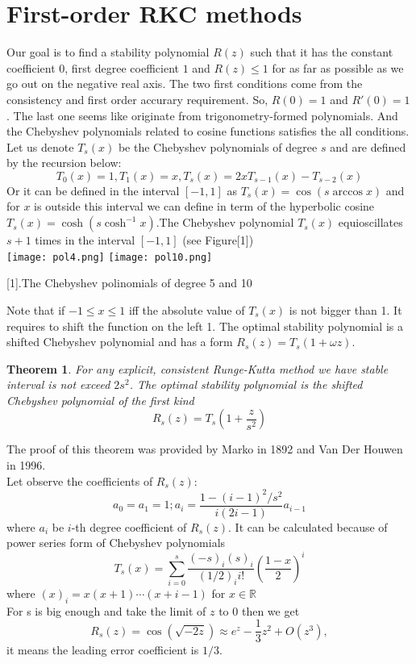 \documentclass{article}
\theoremstyle{theorem}
\newtheorem{theorem}{Theorem}
\theoremstyle{definition}
\begin{document}
	\section{First-order RKC methods}
Our goal is to find a stability polynomial $R(z)$ such that it has the constant coefficient $0$, first degree coefficient $1$ and $R(z) \le 1$ for as far as possible as we go out on the negative real axis. The two first conditions come from the consistency and first order accurary requirement. So, $R(0)=1$ and $R'(0)=1$. The last one seems like originate from trigonometry-formed polynomials. And the Chebyshev polynomials related to cosine functions satisfies the all conditions.\\
Let us denote $T_s(x)$ be the Chebyshev polynomials of degree $s$ and are defined by the recursion below: $$T_0(x)=1 , T_1(x)=x , T_s(x)=2xT_{s-1}(x)-T_{s-2}(x)$$
Or it can be defined in the interval $[-1,1]$ as $T_s(x)=\cos(s \arccos x) $ and for $x$ is outside this interval we can define in term of the hyperbolic cosine $T_s(x)=\cosh(s \cosh^{-1} x)$.The Chebyshev polynomial $T_s(x)$ equioscillates $s+1$ times in the
interval $[-1,1]$ (see Figure[1])\\
\texttt{[image: pol4.png]}
\texttt{[image: pol10.png]}	

\begin{center}
	\figurename[1]{.The Chebyshev polinomials of degree 5 and 10}
\end{center}
Note that if $-1 \le x \le 1$ iff the absolute value of $T_s(x)$ is not bigger than 1. It requires to shift the function on the left 1. The optimal stability polynomial is a shifted Chebyshev polynomial and has a form $R_s(z)=T_s(1+\omega z)$.
\begin{theorem}
	For any explicit, consistent Runge-Kutta method we have stable interval is not exceed $2s^2$. The optimal stability polynomial is the shifted Chebyshev polynomial of the first kind
	$$R_s(z)=T_s\left(1+\frac{z}{s^2}\right) $$
\end{theorem}
The proof of this theorem was provided by Marko in 1892 and Van Der Houwen
in 1996. \\
Let observe the coefficients of $R_s(z)$:
$$a_0=a_1=1; a_i=\frac{1-(i-1)^2/s^2}{i(2i-1)}a_{i-1}$$ where $a_i$ be $i$-th degree coefficient of $R_s(z)$. It can be calculated because of power series form of Chebyshev polynomials $$T_s(x)= \sum_{i=0}^{s} \frac{(-s)_i(s)_i}{(1/2)_ii!} \left(\frac{1-x}{2}\right)^i$$ where $(x)_i=x(x+1) \cdots (x+i-1)$ for $x \in \mathbb{R}$\\
For s is big enough and take the limit of $z$ to $0$ then we get 
 $$R_s(z)= \cos (\sqrt{-2z}) \approx e^z-\frac{1}{3}z^2+O (z^3),$$ it means the leading error coefficient is $1/3$.
\end{document}

